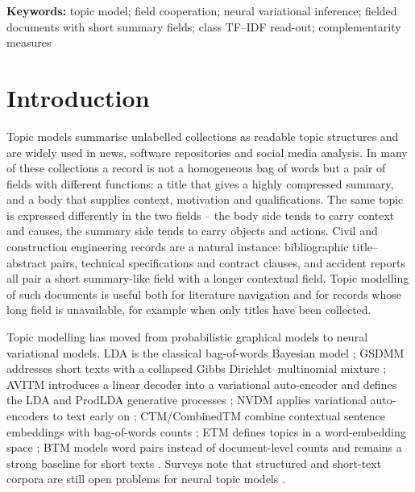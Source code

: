 \documentclass[11pt]{article}
\begin{document}
\noindent\textbf{Keywords:} topic model; field cooperation; neural variational inference;
fielded documents with short summary fields; class TF--IDF read-out; complementarity measures

\section{Introduction}

Topic models summarise unlabelled collections as readable topic structures and are widely used in
news, software repositories and social media analysis. In many of these collections a record is not
a homogeneous bag of words but a pair of fields with different functions: a title that gives a
highly compressed summary, and a body that supplies context, motivation and qualifications. The
same topic is expressed differently in the two fields -- the body side tends to carry context and
causes, the summary side tends to carry objects and actions. Civil and construction engineering
records are a natural instance: bibliographic title--abstract pairs, technical specifications and
contract clauses, and accident reports all pair a short summary-like field with a longer contextual
field. Topic modelling of such documents is useful both for literature navigation and for records
whose long field is unavailable, for example when only titles have been collected.

Topic modelling has moved from probabilistic graphical models to neural variational models. LDA is
the classical bag-of-words Bayesian model \cite{blei2003lda}; GSDMM addresses short texts with a
collapsed Gibbs Dirichlet--multinomial mixture \cite{yin2014gsdmm}; AVITM introduces a linear
decoder into a variational auto-encoder and defines the LDA and ProdLDA generative processes
\cite{srivastava2017avitm}; NVDM applies variational auto-encoders to text early on
\cite{miao2016nvdm}; CTM/CombinedTM combine contextual sentence embeddings with bag-of-words
counts \cite{bianchi2021ctm}; ETM defines topics in a word-embedding space \cite{dieng2020etm};
BTM models word pairs instead of document-level counts and remains a strong baseline for short
texts \cite{yan2013btm}. Surveys note that structured and short-text corpora are still open
problems for neural topic models \cite{wu2024survey}.
\end{document}

